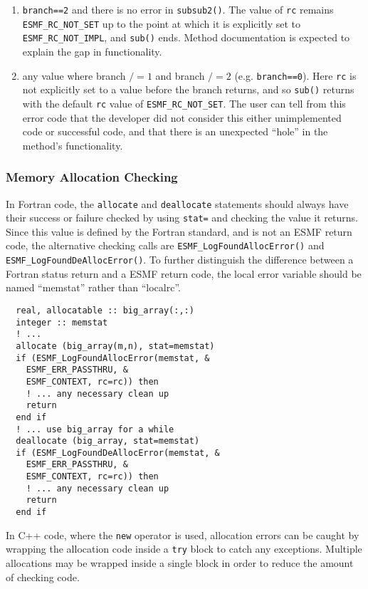 \begin{enumerate}
\item {\tt branch==2} and there is no error in {\tt subsub2()}. The value of {\tt rc} remains {\tt ESMF\_RC\_NOT\_SET} up to the point at which it is explicitly set to {\tt ESMF\_RC\_NOT\_IMPL}, and {\tt sub()} ends. Method documentation is expected to explain the gap in functionality.

\item any value where branch $/=1$ and branch $/= 2$ (e.g. {\tt branch==0}). Here {\tt rc} is not explicitly set to a value before the branch returns, and so {\tt sub()} returns with the default {\tt rc} value of {\tt ESMF\_RC\_NOT\_SET}. The user can tell from this error code that the developer did not consider this either unimplemented code or successful code, and that there is an unexpected ``hole'' in the method's functionality. 

\end{enumerate}

\subsubsection{Memory Allocation Checking}

In Fortran code, the {\tt allocate} and {\tt deallocate} statements should
always have their success or failure checked by using {\tt stat=} and checking
the value it returns.  Since this value is defined by the Fortran
standard, and is not an ESMF return code, the alternative checking calls are
{\tt ESMF\_LogFoundAllocError()} and {\tt ESMF\_LogFoundDeAllocError()}.
To further distinguish the difference between a Fortran status return
and a ESMF return code, the local error variable should be named ``memstat''
rather than ``localrc''.

\begin{verbatim}
  real, allocatable :: big_array(:,:)
  integer :: memstat
  ! ...
  allocate (big_array(m,n), stat=memstat)
  if (ESMF_LogFoundAllocError(memstat, &
    ESMF_ERR_PASSTHRU, &
    ESMF_CONTEXT, rc=rc)) then
    ! ... any necessary clean up
    return
  end if
  ! ... use big_array for a while
  deallocate (big_array, stat=memstat)
  if (ESMF_LogFoundDeAllocError(memstat, &
    ESMF_ERR_PASSTHRU, &
    ESMF_CONTEXT, rc=rc)) then
    ! ... any necessary clean up
    return
  end if
\end{verbatim}

In C++ code, where the {\tt new} operator is used, allocation errors can
be caught by wrapping the allocation code inside a {\tt try} block to catch
any exceptions.  Multiple allocations may be wrapped inside a single block
in order to reduce the amount of checking code.

